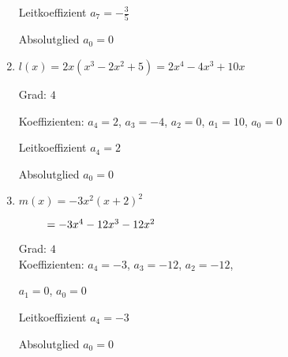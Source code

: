 \begin{Answer}[ref=ganzHauptA1]
\begin{minipage}{\textwidth}
\begin{minipage}[t]{0.5\textwidth}
\begin{enumerate}[label=\alph*)]
				Leitkoeffizient \(a_7=-\frac{3}{5}\)
				
				Absolutglied \(a_0=0\)
				\item \(l(x)=2x\left(x^3-2x^2+5\right)=2x^4-4x^3+10x\)
				
				Grad: \(4\)
				
				Koeffizienten: \(a_4=2\), \(a_3=-4\), \(a_2=0\), \(a_1=10\), \(a_0=0\)
				
				Leitkoeffizient \(a_4=2\)
				
				Absolutglied \(a_0=0\)
				\item \(m(x)=-3x^2\left(x+2\right)^2\)
				
				\(\hphantom{m(x)}=-3x^4-12x^3-12x^2\)
				
				Grad: \(4\)\\
				Koeffizienten: \(a_4=-3\), \(a_3=-12\), \(a_2=-12\),
				
				\(a_1=0\), \(a_0=0\)
				
				Leitkoeffizient \(a_4=-3\)
				
				Absolutglied \(a_0=0\)
			\end{enumerate}
		\end{minipage}%
	\end{minipage}%
\end{Answer}